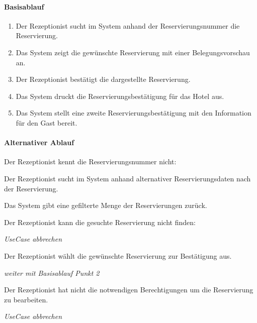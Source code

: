 \paragraph{Basisablauf}
\begin{enumerate}
	\item Der \Gls{Rezeptionist} sucht im System anhand der \Gls{Reservierungsnummer} die \Gls{Reservierung}.
	\item Das System zeigt die gewünschte \Gls{Reservierung} mit einer Belegungsvorschau an.
	\item Der \Gls{Rezeptionist} bestätigt die dargestellte \Gls{Reservierung}.
	\item Das System druckt die Reservierungsbestätigung für das Hotel aus.
	\item Das System stellt eine zweite Reservierungsbestätigung mit den Information für den \Gls{Gast} bereit.
\end{enumerate}

\paragraph{Alternativer Ablauf}
\begin{longenum}
	\item
	\begin{longenum}
		\item Der Rezeptionist kennt die \Gls{Reservierungsnummer} nicht:
		\begin{longenum}
			\item Der \Gls{Rezeptionist} sucht im System anhand alternativer Reservierungsdaten nach der \Gls{Reservierung}.
			\item Das System gibt eine gefilterte Menge der \Gls{Reservierung}en zurück.
			\begin{longenum}
				\item Der \Gls{Rezeptionist} kann die gesuchte Reservierung nicht finden:
				\begin{longenum}
					\item \emph{UseCase abbrechen}
				\end{longenum}
			\end{longenum}
			\item Der \Gls{Rezeptionist} wählt die gewünschte Reservierung zur Bestätigung aus.
			\item \emph{weiter mit Basisablauf Punkt 2}
		\end{longenum}
	\end{longenum}
	\item
	\item
	\begin{longenum}
		\item Der \Gls{Rezeptionist} hat nicht die notwendigen Berechtigungen um die Reservierung zu bearbeiten.
		\begin{longenum}
			\item \emph{UseCase abbrechen}
		\end{longenum}
	\end{longenum}
	\item
	\item
\end{longenum}


